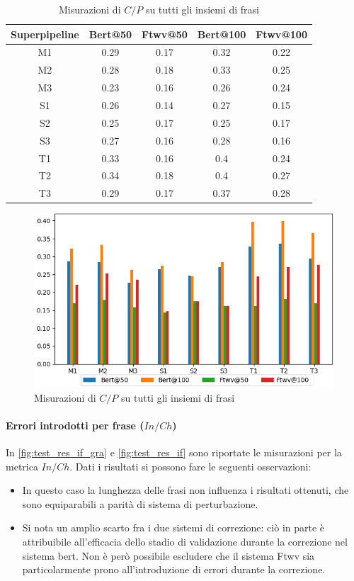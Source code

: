 \begin{table}[H]
\centering
\begin{tabular}{c|cc|cc}
\textbf{Superpipeline} & \textbf{Bert@50} &  \textbf{Ftwv@50} & \textbf{Bert@100} & \textbf{Ftwv@100}\\
\hline
M1& 0.29& 0.17& 0.32& 0.22\\
M2& 0.28& 0.18& 0.33& 0.25\\
M3& 0.23& 0.16& 0.26& 0.24\\
S1& 0.26& 0.14& 0.27& 0.15\\
S2& 0.25& 0.17& 0.25& 0.17\\
S3& 0.27& 0.16& 0.28& 0.16\\
T1& 0.33& 0.16& 0.4& 0.24\\
T2& 0.34& 0.18& 0.4& 0.27\\
T3& 0.29& 0.17& 0.37& 0.28\\
\end{tabular}
\caption{Misurazioni di $C/P$ su tutti gli insiemi di frasi}
\label{fig:test_res_cp_gra}
\end{table}

\begin{figure}[H]
\centering
\includegraphics[width=\textwidth]{immagini/test/cp}
\caption{Misurazioni di $C/P$ su tutti gli insiemi di frasi}
\label{fig:test_res_cp}
\end{figure}

\paragraph{Errori introdotti per frase ($In/Ch$)}
In \autoref{fig:test_res_if_gra} e \autoref{fig:test_res_if} sono riportate le misurazioni per la metrica $In/Ch$. Dati i risultati si possono fare le seguenti osservazioni:
\begin{itemize}
\item In questo caso la lunghezza delle frasi non influenza i risultati ottenuti, che sono equiparabili a parità di sistema di perturbazione.

\item Si nota un amplio scarto fra i due sistemi di correzione: ciò in parte è attribuibile all'efficacia dello stadio di validazione durante la correzione nel sistema bert. Non è però possibile escludere che il sistema Ftwv sia particolarmente prono all'introduzione di errori durante la correzione.
\end{itemize}

